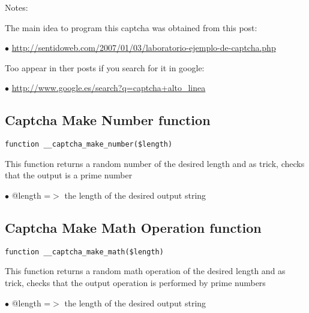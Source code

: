 \documentclass[a4paper]{book}
\def\htmladdnormallink#1#2{\href{#2}{#1}}
\begin{document}
Notes:

The main idea to program this captcha was obtained from this post:

\begin{compactitem}
\item[\color{myblue}$\bullet$] \htmladdnormallink{http://sentidoweb.com/2007/01/03/laboratorio-ejemplo-de-captcha.php}{http://sentidoweb.com/2007/01/03/laboratorio-ejemplo-de-captcha.php}
\end{compactitem}

Too appear in ther posts if you search for it in google:

\begin{compactitem}
\item[\color{myblue}$\bullet$] \htmladdnormallink{http://www.google.es/search?q=captcha+alto\_linea}{http://www.google.es/search?q=captcha+alto\_linea}
\end{compactitem}

\hypertarget{toc47}{}
\subsection{Captcha Make Number function}

\begin{lstlisting}
function __captcha_make_number($length)
\end{lstlisting}

This function returns a random number of the desired length and as trick,
checks that the output is a prime number

\begin{compactitem}
\item[\color{myblue}$\bullet$] @length =$>$ the length of the desired output string
\end{compactitem}

\hypertarget{toc48}{}
\subsection{Captcha Make Math Operation function}

\begin{lstlisting}
function __captcha_make_math($length)
\end{lstlisting}

This function returns a random math operation of the desired length and
as trick, checks that the output operation is performed by prime numbers

\begin{compactitem}
\item[\color{myblue}$\bullet$] @length =$>$ the length of the desired output string
\end{compactitem}
\end{document}
